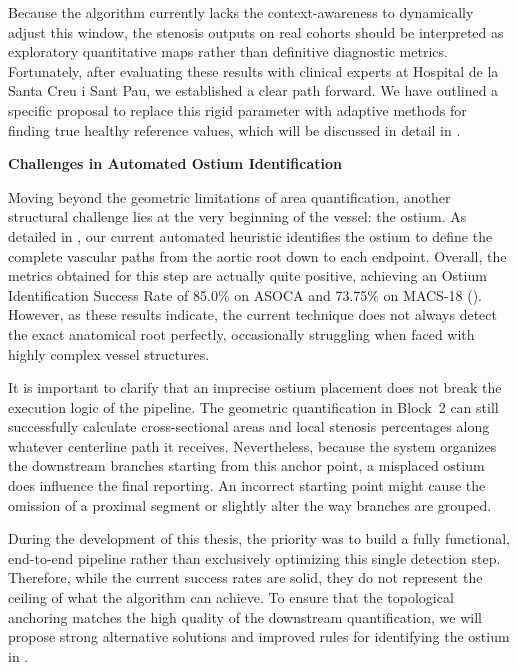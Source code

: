 Because the algorithm currently lacks the context-awareness to dynamically adjust this window, the stenosis outputs on real cohorts should be interpreted as exploratory quantitative maps rather than definitive diagnostic metrics. Fortunately, after evaluating these results with clinical experts at Hospital de la Santa Creu i Sant Pau, we established a clear path forward. We have outlined a specific proposal to replace this rigid parameter with adaptive methods for finding true healthy reference values, which will be discussed in detail in .

\vspace{0.75em}
\noindent\textbf{Challenges in Automated Ostium Identification}\par
\vspace{0.4em}
\noindent
Moving beyond the geometric limitations of area quantification, another structural challenge lies at the very beginning of the vessel: the ostium. As detailed in , our current automated heuristic identifies the ostium to define the complete vascular paths from the aortic root down to each endpoint. Overall, the metrics obtained for this step are actually quite positive, achieving an Ostium Identification Success Rate of 85.0\% on ASOCA and 73.75\% on MACS-18 (). However, as these results indicate, the current technique does not always detect the exact anatomical root perfectly, occasionally struggling when faced with highly complex vessel structures.

It is important to clarify that an imprecise ostium placement does not break the execution logic of the pipeline. The geometric quantification in Block~2 can still successfully calculate cross-sectional areas and local stenosis percentages along whatever centerline path it receives. Nevertheless, because the system organizes the downstream branches starting from this anchor point, a misplaced ostium does influence the final reporting. An incorrect starting point might cause the omission of a proximal segment or slightly alter the way branches are grouped.

During the development of this thesis, the priority was to build a fully functional, end-to-end pipeline rather than exclusively optimizing this single detection step. Therefore, while the current success rates are solid, they do not represent the ceiling of what the algorithm can achieve. To ensure that the topological anchoring matches the high quality of the downstream quantification, we will propose strong alternative solutions and improved rules for identifying the ostium in .

